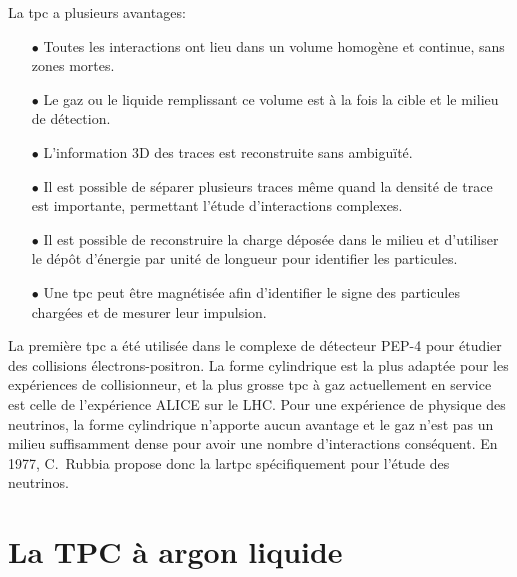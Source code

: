     La \gls{tpc} a plusieurs avantages:
    \begin{itemize}
      \item[$\bullet$] Toutes les interactions ont lieu dans un volume homogène et continue, sans zones mortes.
      \item[$\bullet$] Le gaz ou le liquide remplissant ce volume est à la fois la cible et le milieu de détection.
      \item[$\bullet$] L'information 3D des traces est reconstruite sans ambiguïté.
      \item[$\bullet$] Il est possible de séparer plusieurs traces même quand la densité de trace est importante, permettant l'étude d'interactions complexes.
      \item[$\bullet$] Il est possible de reconstruire la charge déposée dans le milieu et d'utiliser le dépôt d'énergie par unité de longueur pour identifier les particules.
      \item[$\bullet$] Une \gls{tpc} peut être magnétisée afin d'identifier le signe des particules chargées et de mesurer leur impulsion.
    \end{itemize}
    
    La première \gls{tpc} a été utilisée dans le complexe de détecteur PEP-4 pour étudier des collisions électrons-positron. La forme cylindrique est la plus adaptée pour les expériences de collisionneur, et la plus grosse \gls{tpc} à gaz actuellement en service est celle de l'expérience ALICE sur le LHC. Pour une expérience de physique des neutrinos, la forme cylindrique n'apporte aucun avantage et le gaz n'est pas un milieu suffisamment dense pour avoir une nombre d'interactions conséquent. En 1977, C.~Rubbia propose donc la \acrfull{lartpc} \cite{Rubbia1977} spécifiquement pour l'étude des neutrinos.
    
  \section{La TPC à argon liquide}\label{sec::lartpc}
    

